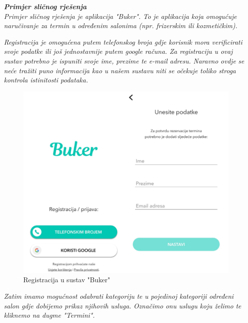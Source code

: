 		\textbf{\textit{Primjer sličnog rješenja}}\\
		
		\textit{Primjer sličnog rješenja je aplikacija "Buker". To je aplikacija koja omogućuje naručivanje za termin u određenim salonima (npr. frizerskim ili kozmetičkim). }
		
		\textit{Registracija je omogućena putem telefonskog broja gdje korisnik mora verificirati svoje podatke ili još jednostavnije putem google računa. Za registraciju u ovaj sustav potrebno je ispuniti svoje ime, prezime te e-mail adresu. Naravno ovdje se neće tražiti puno informacija kao u našem sustavu niti se očekuje toliko stroga kontrola istinitosti podataka. }
		
		\begin{figure}[H]
			\includegraphics[scale=0.6]{slike/Buker-registracija.PNG} %
			\centering
			\caption{Registracija u sustav "Buker"}
			\label{fig:promjene}
		\end{figure}
		
		\textit{Zatim imamo mogućnost odabrati kategoriju te u pojedinoj kategoriji određeni salon gdje dobijemo prikaz njihovih usluga. Označimo onu uslugu koju želimo te kliknemo na dugme "Termini".}
		
